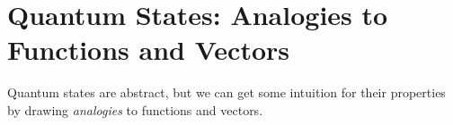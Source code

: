%
%
%
%

\section*{Quantum States: Analogies to Functions and Vectors}

	Quantum states are abstract, but we can get some intuition for their properties by drawing \emph{analogies} to functions and vectors.

